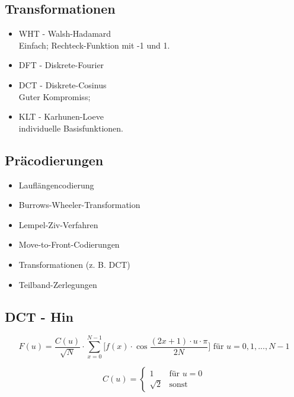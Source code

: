 \begin{multicols}{2}

\subsection*{Transformationen}
\begin{minipage}{\columnwidth}
\begin{itemize}
	\setlength{\parskip}{0pt}
	\setlength{\itemsep}{0pt}
	\item WHT - Walsh-Hadamard\\
			Einfach; Rechteck-Funktion mit -1 und 1.
	\item DFT - Diskrete-Fourier
	\item DCT - Diskrete-Cosinus\\
			Guter Kompromiss; 
	\item KLT - Karhunen-Loeve\\
			individuelle Basisfunktionen.
\end{itemize}
\end{minipage}

\subsection*{Präcodierungen}
\begin{minipage}{\columnwidth}
\begin{itemize}
	\setlength{\parskip}{0pt}
	\setlength{\itemsep}{0pt}
	\item Lauflängencodierung
	\item Burrows-Wheeler-Transformation
	\item Lempel-Ziv-Verfahren
	\item Move-to-Front-Codierungen
	\item Transformationen (z. B. DCT)
	\item Teilband-Zerlegungen
\end{itemize}
\end{minipage}

\end{multicols}

\subsection*{DCT - Hin}
\[
F(u) = \frac{C(u)}{\sqrt{N}}
	\cdot \sum_{x=0}^{N-1} \bigg[ f(x)
	\cdot \cos{\frac{(2x+1) \cdot u \cdot \pi{}}{2N}}
	\bigg] \mbox{  für } u=0,1,...,N-1
\]
	
\[
C(u) = \begin{cases}1&\text{für }
	u=0\\\sqrt{2}&\text{sonst}\end{cases}
\]